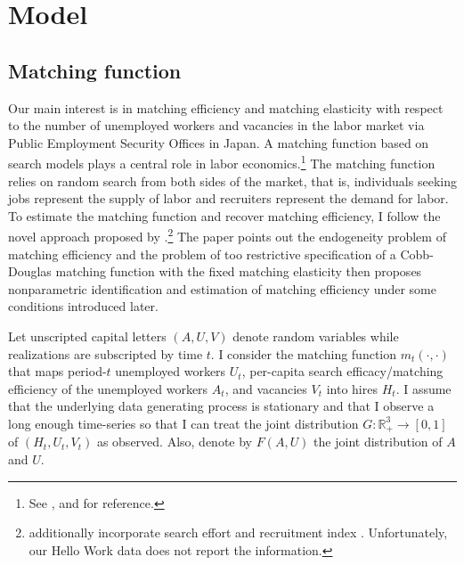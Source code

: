 \documentclass[12pt]{article}
\begin{document}
\section{Model}
\subsection{Matching function}
Our main interest is in matching efficiency and matching elasticity with respect to the number of unemployed workers and vacancies in the labor market via Public Employment Security Offices in Japan.
A matching function based on search models plays a central role in labor economics.\footnote{See \cite{pissarides2000equilibrium,petrongolo2001looking}, and \cite{rogerson2005search} for reference.} 
The matching function relies on random search from both sides of the market, that is, individuals seeking jobs represent the supply of labor and recruiters represent the demand for labor.
To estimate the matching function and recover matching efficiency, I follow the novel approach proposed by \cite{lange2020beyond}.\footnote{\cite{lange2020beyond} additionally incorporate search effort \citep{mukoyama2018job} and recruitment index \citep{davis2013establishment}. Unfortunately, our Hello Work data does not report the information.}
The paper points out the endogeneity problem of matching efficiency \citep{borowczyk2013accounting} and the problem of too restrictive specification of a Cobb-Douglas matching function with the fixed matching elasticity then proposes nonparametric identification and estimation of matching efficiency under some conditions introduced later.

Let unscripted capital letters $(A, U, V)$ denote random variables while realizations are subscripted by time $t$. 
I consider the matching function $m_t(\cdot,\cdot)$ that maps period-$t$ unemployed workers $U_t$, per-capita search efficacy/matching efficiency of the unemployed workers $A_t$, and vacancies $V_t$ into hires $H_t$.
I assume that the underlying data generating process is stationary and that I observe a long enough time-series so that I can treat the joint distribution $G: \mathbb{R}_{+}^3 \rightarrow[0,1]$ of $\left(H_t, U_t, V_t\right)$ as observed. 
Also, denote by $F(A, U)$ the joint distribution of $A$ and $U$.
\end{document}
